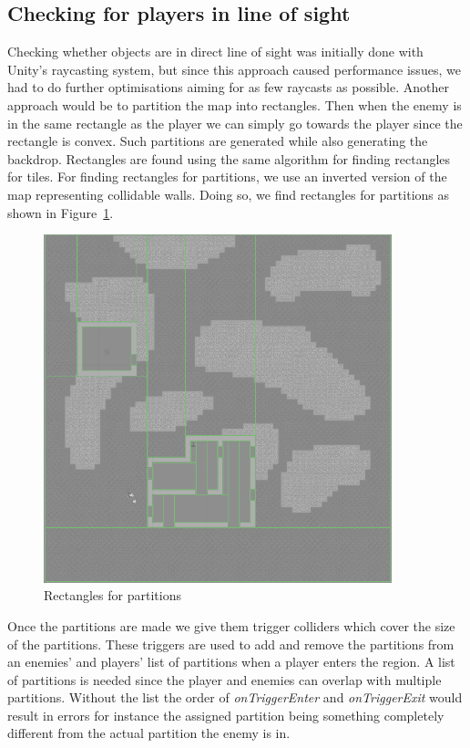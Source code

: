 \subsection*{Checking for players in line of sight}
Checking whether objects are in direct line of sight was initially done with Unity's raycasting system, but since this approach caused performance issues, we had to do further optimisations aiming for as few raycasts as possible.
Another approach would be to partition the map into rectangles.
Then when the enemy is in the same rectangle as the player we can simply go towards the player since the rectangle is convex.
Such partitions are generated while also generating the backdrop. Rectangles
are found using the same algorithm for finding rectangles for tiles. For
finding rectangles for partitions, we use an inverted version of the map
representing collidable walls. Doing so, we find rectangles for partitions as
shown in Figure~\ref{fig:partition_colliders_on_map}.

\begin{figure}[H]
        \includegraphics[width=0.9\textwidth]{figures/generating_levels/partition_colliders.png}
    \caption{Rectangles for partitions}\label{fig:partition_colliders_on_map}
\end{figure}

Once the partitions are made we give them trigger colliders which cover the size of the partitions.
These triggers are used to add and remove the partitions from an enemies' and players' list of partitions when a player enters the region.
A list of partitions is needed since the player and enemies can overlap with multiple partitions.
Without the list the order of \textit{onTriggerEnter} and \textit{onTriggerExit} would result in errors for instance the assigned partition being something completely different from the actual partition the enemy is in.



